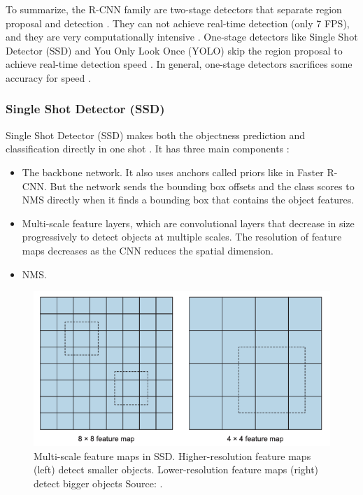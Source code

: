 \documentclass[a4paper, 11pt, oneside]{article}
\begin{document}
To summarize, the R-CNN family are two-stage detectors that separate region proposal and detection
\cite{elgendy2020deep, liu2020deep}. They can not achieve real-time detection (only 7 FPS), and they are very
computationally intensive \cite{elgendy2020deep, liu2016ssd, redmon2016you}.
One-stage detectors like Single Shot Detector (SSD) and You Only Look Once (YOLO) skip the region proposal to achieve
real-time detection speed \cite{elgendy2020deep}. In general, one-stage detectors sacrifices some accuracy for speed
\cite{elgendy2020deep, lin2017focal}.

\subsubsection{Single Shot Detector (SSD)}

Single Shot Detector (SSD) makes both the objectness prediction and classification directly in one shot
\cite{elgendy2020deep, liu2016ssd}. It has three main components \cite{elgendy2020deep, liu2016ssd}:

\begin{itemize}
  \item The backbone network. It also uses anchors called priors like in Faster R-CNN.
  But the network sends the bounding box offsets and the class scores to NMS directly when it finds a bounding box that
  contains the object features.
  \item Multi-scale feature layers, which are convolutional layers that decrease in size progressively to detect objects
  at multiple scales. The resolution of feature maps decreases as the CNN reduces the spatial dimension.
  \item NMS.
\end{itemize}

\begin{figure}[ht]
  \begin{center}
    \includegraphics[width=.8\textwidth]{ssd_feature_maps.png}
  \end{center}
  \caption{Multi-scale feature maps in SSD. Higher-resolution feature maps (left) detect smaller objects.
  Lower-resolution feature maps (right) detect bigger objects Source: \cite{elgendy2020deep}.}
\end{figure}
\end{document}
